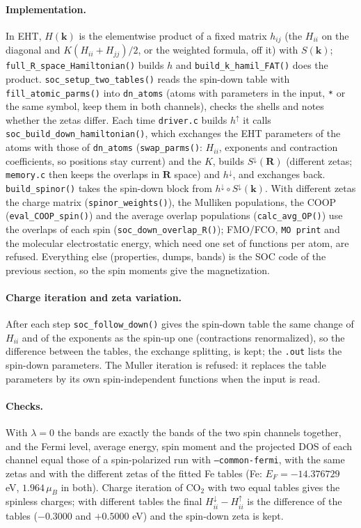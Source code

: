 \documentclass[11pt,a4paper]{article}
\newcommand{\file}[1]{\texttt{#1}}
\newcommand{\fn}[1]{\texttt{#1()}}
\newcommand{\var}[1]{\texttt{#1}}
\newcommand{\opt}[1]{\texttt{#1}}
\begin{document}
\paragraph{Implementation.} In EHT, $H(\mathbf{k})$ is the elementwise product of a fixed
matrix $h_{ij}$ (the $H_{ii}$ on the diagonal and $K(H_{ii}+H_{jj})/2$, or the weighted
formula, off it) with $S(\mathbf{k})$; \fn{full\_R\_space\_Hamiltonian} builds $h$ and
\fn{build\_k\_hamil\_FAT} does the product. \fn{soc\_setup\_two\_tables} reads the
spin-down table with \fn{fill\_atomic\_parms} into \var{dn\_atoms} (atoms with parameters in
the input, \texttt{*} or the same symbol, keep them in both channels), checks the shells and
notes whether the zetas differ. Each time \file{driver.c} builds $h^\uparrow$ it calls
\fn{soc\_build\_down\_hamiltonian}, which exchanges the EHT parameters of the atoms with
those of \var{dn\_atoms} (\fn{swap\_parms}: $H_{ii}$, exponents and contraction
coefficients, so positions stay current) and the $K$, builds $S^\downarrow(\mathbf{R})$
(different zetas; \file{memory.c} then keeps the overlaps in $\mathbf{R}$ space) and
$h^\downarrow$, and exchanges back. \fn{build\_spinor} takes the spin-down block from
$h^\downarrow\circ S^\downarrow(\mathbf{k})$. With different zetas the charge matrix
(\fn{spinor\_weights}), the Mulliken populations, the COOP (\fn{eval\_COOP\_spin}) and the
average overlap populations (\fn{calc\_avg\_OP}) use the overlaps of each spin
(\fn{soc\_down\_overlap\_R}); FMO/FCO, \texttt{MO print} and the molecular electrostatic
energy, which need one set of functions per atom, are refused. Everything else
(properties, dumps, bands) is the SOC code of the previous section, so the spin moments
give the magnetization.

\paragraph{Charge iteration and zeta variation.} After each step \fn{soc\_follow\_down}
gives the spin-down table the same change of $H_{ii}$ and of the exponents as the spin-up
one (contractions renormalized), so the difference between the tables, the exchange
splitting, is kept; the \texttt{.out} lists the spin-down parameters. The Muller iteration
is refused: it replaces the table parameters by its own spin-independent functions when
the input is read.

\paragraph{Checks.} With $\lambda=0$ the bands are exactly the bands of the two spin
channels together, and the Fermi level, average energy, spin moment and the projected DOS
of each channel equal those of a spin-polarized run with \opt{--common-fermi}, with the
same zetas and with the different zetas of the fitted Fe tables (Fe: $E_F=-14.376729$ eV,
$1.964\,\mu_B$ in both). Charge iteration of CO$_2$ with two equal tables gives the
spinless charges; with different tables the final $H_{ii}^\downarrow-H_{ii}^\uparrow$ is the
difference of the tables ($-0.3000$ and $+0.5000$ eV) and the spin-down zeta is kept.
\end{document}
